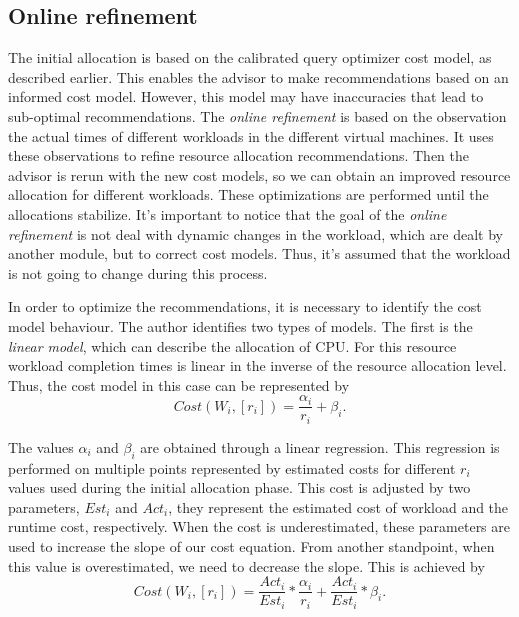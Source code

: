 \subsection{Online refinement}

The initial allocation is based on the calibrated query optimizer cost model, as described earlier. This enables the advisor to make recommendations based on an informed cost model. However, this model may have inaccuracies that lead to sub-optimal recommendations. The  \textit{online refinement} is based on the observation the actual times of different workloads in the different virtual machines. It uses these observations to refine resource allocation recommendations. Then the advisor is rerun with the new cost models, so  we can obtain an improved resource allocation for different workloads. These optimizations are performed until the allocations stabilize. It's important to notice that the goal of the \textit{online refinement} is not deal with dynamic changes in the workload, which are dealt by another module, but to correct cost models. Thus, it's assumed that the workload is not going to change during this process. 

In order to optimize the recommendations, it is necessary to identify the cost model behaviour. The author identifies two types of models. The first is the \textit{linear model}, which can describe the allocation of CPU. For this resource workload completion times is linear in the inverse of the resource allocation level. Thus, the cost model in this case can be represented by
\[
 Cost(W_{i}, [r_{i}]) = \frac{\alpha_{i}}{r_{i}} +\beta_{i}.
\]

The values $\alpha_{i}$ and $\beta_{i}$ are obtained through a linear regression. This regression is performed on multiple points represented by estimated costs for different $r_{i}$ values used during the initial allocation phase. This cost is adjusted by two parameters, $Est_{i}$ and $Act_{i}$, they represent the estimated cost of workload and the runtime cost, respectively. When the cost is underestimated, these parameters are used to increase the slope of our cost equation. From another standpoint, when this value is overestimated, we need to decrease the slope. This is achieved by
\[
  Cost(W_{i}, [r_{i}]) = \frac{Act_{i}}{Est_{i}} * \frac{\alpha_{i}}{r_{i}} + \frac{Act_{i}}{Est_{i}} * \beta_{i}.
\]

